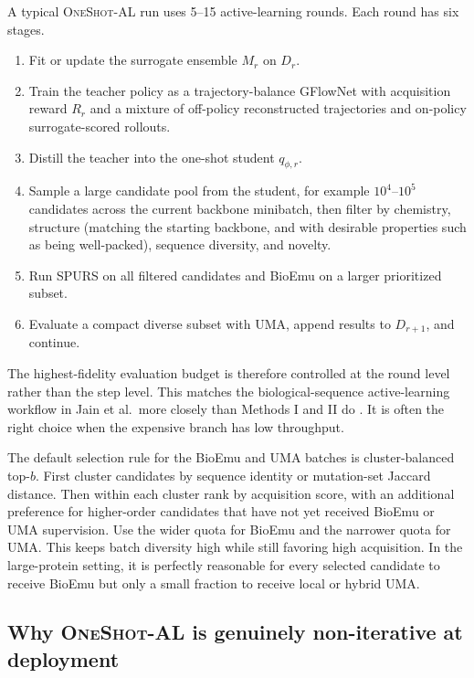 \documentclass[11pt]{article}
\newcommand{\methodIII}{\textsc{OneShot-AL}}
\begin{document}
	A typical \methodIII{} run uses 5--15 active-learning rounds. Each round has six stages.
	\begin{enumerate}[leftmargin=1.5em]
		\item Fit or update the surrogate ensemble $M_r$ on $D_r$.
		\item Train the teacher policy as a trajectory-balance GFlowNet with acquisition reward $R_r$ and a mixture of off-policy reconstructed trajectories and on-policy surrogate-scored rollouts.
		\item Distill the teacher into the one-shot student $q_{\phi,r}$.
		\item Sample a large candidate pool from the student, for example $10^4$--$10^5$ candidates across the current backbone minibatch, then filter by chemistry, structure (matching the starting backbone, and with desirable properties such as being well-packed), sequence diversity, and novelty.
		\item Run SPURS on all filtered candidates and BioEmu on a larger prioritized subset.
		\item Evaluate a compact diverse subset with UMA, append results to $D_{r+1}$, and continue.
	\end{enumerate}
	The highest-fidelity evaluation budget is therefore controlled at the round level rather than the step level. This matches the biological-sequence active-learning workflow in Jain et al.~more closely than Methods I and II do \citep{jain2022bioseqgfn}. It is often the right choice when the expensive branch has low throughput.
	
	The default selection rule for the BioEmu and UMA batches is cluster-balanced top-$b$. First cluster candidates by sequence identity or mutation-set Jaccard distance. Then within each cluster rank by acquisition score, with an additional preference for higher-order candidates that have not yet received BioEmu or UMA supervision. Use the wider quota for BioEmu and the narrower quota for UMA. This keeps batch diversity high while still favoring high acquisition. In the large-protein setting, it is perfectly reasonable for every selected candidate to receive BioEmu but only a small fraction to receive local or hybrid UMA.
	
	\subsection{Why \methodIII{} is genuinely non-iterative at deployment}
	
\end{document}
